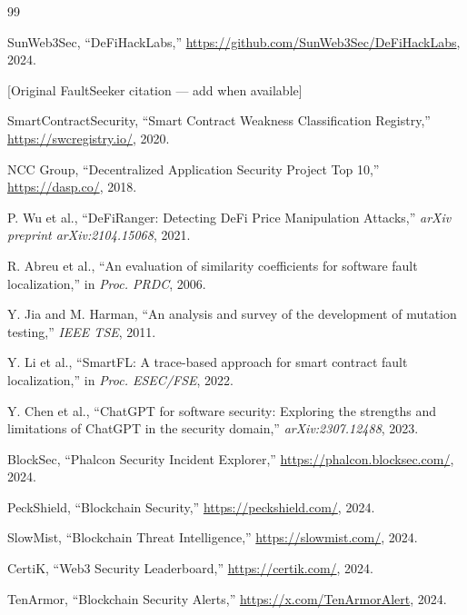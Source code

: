 \documentclass[conference]{IEEEtran}
\begin{document}

\begin{thebibliography}{99}

SunWeb3Sec, ``DeFiHackLabs,''
\url{https://github.com/SunWeb3Sec/DeFiHackLabs}, 2024.

[Original FaultSeeker citation — add when available]

SmartContractSecurity, ``Smart Contract Weakness Classification Registry,''
\url{https://swcregistry.io/}, 2020.

NCC Group, ``Decentralized Application Security Project Top 10,''
\url{https://dasp.co/}, 2018.

P. Wu et al., ``DeFiRanger: Detecting DeFi Price Manipulation Attacks,''
\textit{arXiv preprint arXiv:2104.15068}, 2021.

R. Abreu et al., ``An evaluation of similarity coefficients for
software fault localization,'' in \textit{Proc. PRDC}, 2006.

Y. Jia and M. Harman, ``An analysis and survey of the development
of mutation testing,'' \textit{IEEE TSE}, 2011.

Y. Li et al., ``SmartFL: A trace-based approach for smart contract fault
localization,'' in \textit{Proc. ESEC/FSE}, 2022.

Y. Chen et al., ``ChatGPT for software security: Exploring the strengths
and limitations of ChatGPT in the security domain,''
\textit{arXiv:2307.12488}, 2023.

BlockSec, ``Phalcon Security Incident Explorer,''
\url{https://phalcon.blocksec.com/}, 2024.

PeckShield, ``Blockchain Security,'' \url{https://peckshield.com/}, 2024.

SlowMist, ``Blockchain Threat Intelligence,'' \url{https://slowmist.com/}, 2024.

CertiK, ``Web3 Security Leaderboard,'' \url{https://certik.com/}, 2024.

TenArmor, ``Blockchain Security Alerts,'' \url{https://x.com/TenArmorAlert}, 2024.

\end{thebibliography}
\end{document}
